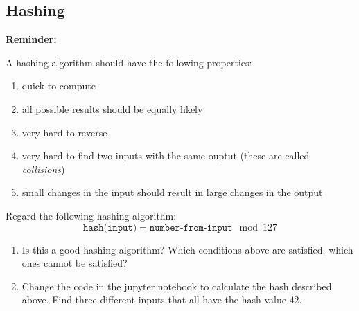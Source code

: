 \documentclass[11pt,a4paper]{report}
\begin{document}
%
%
%
%
%


\newpage

\subsection{Hashing}
{\bf Reminder: }

A hashing algorithm should have the following properties:
\begin{enumerate}
\item  quick to compute
\item  all possible results should be equally likely
\item  very hard to reverse
\item  very hard to find two inputs with the same ouptut (these are called \emph{collisions})
\item  small changes in the input should result in large changes in the output
\end{enumerate}


\begin{ex}
Regard the following hashing algorithm: 
\[
\texttt{hash(input)} = \texttt{number-from-input} \mod 127
\]
\begin{enumerate}
\item Is this a good hashing algorithm? Which conditions above are satisfied, which ones cannot be satisfied?
\item Change the code in the jupyter notebook to calculate the hash described above. Find three different inputs that all have the hash value $42$.
\end{enumerate}

\end{ex}
\end{document}
